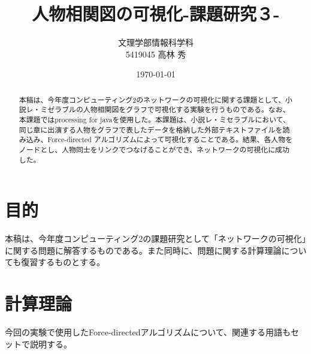 \documentclass[dvipdfmx]{jsarticle}
\title{人物相関図の可視化-課題研究３-}
\author{文理学部情報科学科\\5419045 高林 秀}
\date{\today}
\begin{document}
\maketitle

\begin{abstract}
本稿は、今年度コンピューティング2のネットワークの可視化に関する課題として、小説レ・ミゼラブルの人物相関図をグラフで可視化する実験を行うものである。なお、本課題ではprocessing for javaを使用した。本課題は、小説レ・ミセラブルにおいて、同じ章に出演する人物をグラフで表したデータを格納した外部テキストファイルを読み込み、Force-directed アルゴリズムによって可視化することである。結果、各人物をノードとし、人物同士をリンクでつなげることができ、ネットワークの可視化に成功した。
\end{abstract}

\section{目的}
本稿は、今年度コンピューティング2の課題研究として「ネットワークの可視化」に関する問題に解答するものである。また同時に、問題に関する計算理論についても復習するものとする。
\section{計算理論}
今回の実験で使用したForce-directedアルゴリズムについて、関連する用語もセットで説明する。
\end{document}
